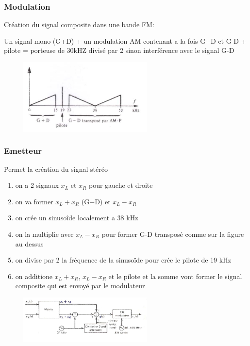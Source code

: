 \documentclass[12pt]{article}
\begin{document}
			\subsubsection{Modulation}
				
				Création du signal composite dans une bande FM:
				
				Un signal mono (G+D) + un modulation AM contenant a la fois G+D et G-D + pilote = porteuse de 30kHZ divisé par 2 sinon interférence avec le signal G-D
				
				\begin{figure}[htp]
				\centering
				\includegraphics[width=0.6\textwidth]{img/signalStéréo.png}
				\end{figure}
			
			\subsubsection{Emetteur}
				Permet la création du signal stéréo
				
				\begin{enumerate}
					\item on a 2 signaux $x_L$ et $x_R$ pour gauche et droite
					\item on va former $x_L + x_R$ (G+D) et $x_L - x_R$
					\item on crée un sinusoîde localement a 38 kHz
					\item on la multiplie avec $x_L - x_R$ pour former G-D transposé comme sur la figure au dessus
					\item on divise par 2 la fréquence de la sinusoïde pour crée le pilote de 19 kHz
					\item on additione $x_L + x_R$, $x_L - x_R$ et le pilote et la somme vont former le signal composite qui est envoyé par le modulateur
				\end{enumerate}
				
				\begin{figure}[htp]
				\centering
				\includegraphics[width=0.6\textwidth]{img/emeteurStereo.png}
				\end{figure}
				
\end{document}
